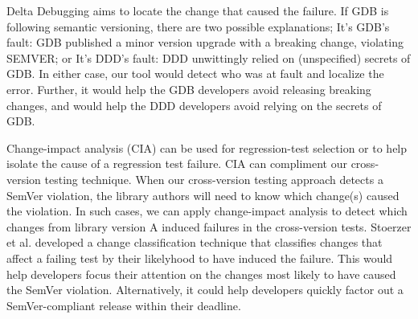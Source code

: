 Delta Debugging aims to locate the change that caused the failure. If GDB is
following semantic versioning, there are two possible explanations; It's GDB's
fault: GDB published a minor version upgrade with a breaking change, violating
SEMVER; or It's DDD's fault: DDD unwittingly relied on (unspecified) secrets of
GDB. In either case, our tool would detect who was at fault and localize the
error. Further, it would help the GDB developers avoid releasing breaking
changes, and would help the DDD developers avoid relying on the secrets of GDB.

Change-impact analysis (CIA) \cite{Chianti,FaultTracer,Stoerzer} can
be used for regression-test selection or to help isolate the cause of
a regression test failure.
%
CIA can compliment our cross-version testing technique.
%
When our cross-version testing approach detects a SemVer violation,
the library authors will need to know which change(s) caused the
violation. In such cases, we can apply change-impact analysis
\cite{Stoerzer} to detect which changes from library version A induced
failures in the cross-version tests. Stoerzer et al. \cite{Stoerzer}
developed a change classification technique that classifies changes
that affect a failing test by their likelyhood to have induced the
failure. This would help developers focus their attention on the
changes most likely to have caused the SemVer
violation. Alternatively, it could help developers quickly factor out
a SemVer-compliant release within their deadline.



